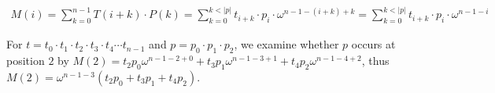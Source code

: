 \documentclass[11pt]{jarticle}
\begin{document}
\begin{eqnarray*}
M(i) = \sum_{k = 0}^{n-1} T(i+k) \cdot P(k) = \sum_{k=0}^{k < |p|} t_{i+k} \cdot p_i \cdot \omega^{n-1-(i+k)+k}
= \sum_{k = 0}^{k < |p|}  t_{i+k} \cdot p_i \cdot \omega^{n-1-i}
\end{eqnarray*}

For $t = t_0 \cdot t_1 \cdot t_2 \cdot t_3 \cdot t_4 \cdots t_{n-1}$ and $p = p_0 \cdot p_1 \cdot p_2$, 
we examine whether $p$ occurs at position $2$ by 
$M(2) = t_2 p_0 \omega^{n-1-2 + 0}+ t_3 p_1 \omega^{n-1-3 + 1} + t_4 p_2 \omega^{n-1-4 + 2}$, thus $M(2) = \omega^{n-1-3}(t_2 p_0 + t_3 p_1 + t_4 p_2)$. 
\end{document}
